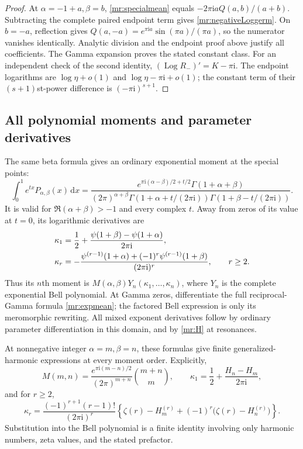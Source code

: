 \documentclass[11pt]{article}
\numberwithin{equation}{section}
\theoremstyle{plain}
\theoremstyle{definition}
\theoremstyle{remark}
\DeclareMathOperator{\Log}{Log}
\newcommand{\ii}{\mathrm i}
\newcommand{\dd}{\,\mathrm d}
\begin{document}
\begin{proof}
At $\alpha=-1+a,\beta=b$, \eqref{mr:specialmean} equals
$-2\pi\ii aQ(a,b)/(a+b)$. Subtracting the complete paired endpoint
term gives \eqref{mr:negativeLoggerm}.
On $b=-a$, reflection gives
$Q(a,-a)=e^{\pi\ii a}\sin(\pi a)/(\pi a)$, so the numerator vanishes
identically. Analytic division and the endpoint proof above justify
all coefficients. The Gamma expansion proves the stated constant class.
For an independent check of the second identity,
$(\Log R_-)'=K-\pi\ii$. The endpoint logarithms are
$\log\eta+o(1)$ and $\log\eta-\pi\ii+o(1)$; the constant term of
their $(s+1)$st-power difference is $(-\pi\ii)^{s+1}$.
\end{proof}

\subsection{All polynomial moments and parameter derivatives}

The same beta formula gives an ordinary exponential moment at the
special points:
\begin{equation}\label{mr:expmean}
 \int_0^1e^{tx}P_{\alpha,\beta}(x)\dd x
 =\frac{e^{\pi\ii(\alpha-\beta)/2+t/2}\Gamma(1+\alpha+\beta)}
 {(2\pi)^{\alpha+\beta}
   \Gamma(1+\alpha+t/(2\pi\ii))
   \Gamma(1+\beta-t/(2\pi\ii))}.
\end{equation}
It is valid for $\Re(\alpha+\beta)>-1$ and every complex $t$.
Away from zeros of its value at $t=0$, its logarithmic derivatives are
\begin{align}
 \kappa_1&=\frac12+\frac{\psi(1+\beta)-\psi(1+\alpha)}{2\pi\ii},\notag\\
 \kappa_r&=-\frac{\psi^{(r-1)}(1+\alpha)
                    +(-1)^r\psi^{(r-1)}(1+\beta)}{(2\pi\ii)^r},
                    \qquad r\ge2.\label{mr:cumulants}
\end{align}
Thus its $n$th moment is $M(\alpha,\beta)Y_n(\kappa_1,\ldots,\kappa_n)$,
where $Y_n$ is the complete exponential Bell polynomial. At Gamma zeros,
differentiate the full reciprocal-Gamma formula \eqref{mr:expmean};
the factored Bell expression is only its meromorphic rewriting.
All mixed exponent derivatives follow by ordinary parameter
differentiation in this domain, and by \eqref{mr:H} at resonances.

At nonnegative integer $\alpha=m,\beta=n$, these formulas give finite
generalized-harmonic expressions at every moment order. Explicitly,
\[
 M(m,n)=
 \frac{e^{\pi\ii(m-n)/2}}{(2\pi)^{m+n}}\binom{m+n}{m},
 \qquad
 \kappa_1=\frac12+\frac{H_n-H_m}{2\pi\ii},
\]
and for $r\ge2$,
\[
 \kappa_r=
 \frac{(-1)^{r+1}(r-1)!}{(2\pi\ii)^r}
 \left\{\zeta(r)-H_m^{(r)}
                 +(-1)^r\bigl(\zeta(r)-H_n^{(r)}\bigr)\right\}.
\]
Substitution into the Bell polynomial is a finite identity involving
only harmonic numbers, zeta values, and the stated prefactor.
\end{document}
